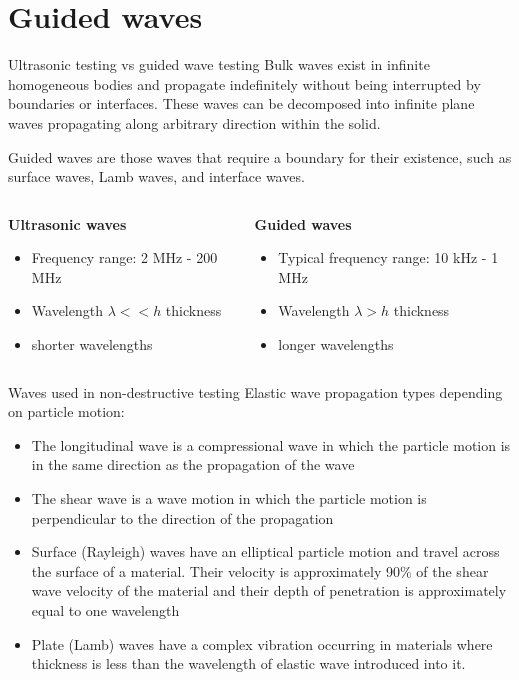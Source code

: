 \documentclass[10pt,aspectratio=169]{beamer} %
\begin{document}
\section{Guided waves}
\begin{frame}{Ultrasonic testing vs guided wave testing}
	\alert{Bulk waves} exist in infinite homogeneous bodies and propagate indefinitely without being interrupted by boundaries or interfaces. 
	These waves can be decomposed into infinite plane waves propagating along arbitrary direction within the solid.
	
	\alert{Guided waves} are those waves that require a boundary for their existence, such as surface waves, Lamb waves, and interface waves.
	\vspace{5mm}
	\begin{columns}[T]
		\begin{column}{0.5\textwidth}
			\textbf{Ultrasonic waves}	
			\begin{itemize}
				\item Frequency range: 2 MHz - 200 MHz
				\item Wavelength \(\lambda << h\) thickness 
				\item shorter wavelengths
			\end{itemize}
		\end{column}
		\begin{column}{0.5\textwidth}
			\textbf{Guided waves}	
			\begin{itemize}
				\item Typical frequency range: 10 kHz - 1 MHz
				\item Wavelength \(\lambda > h\) thickness 
				\item longer wavelengths
			\end{itemize}
		\end{column}
	\end{columns}			
\end{frame}
\begin{frame}{Waves used in non-destructive testing}
	Elastic wave propagation types depending on particle motion:
	\begin{itemize}
		\item  \alert{The longitudinal wave} is a compressional wave in which the particle motion is in the same direction as the propagation of the wave
		\item \alert{The shear wave} is a wave motion in which the particle motion is perpendicular to the direction of the propagation
		\item \alert{Surface (Rayleigh) waves} have an elliptical particle motion and travel across the surface of a material. Their velocity is approximately 90\% of the shear wave velocity of the material and their depth of penetration is approximately equal to one
		wavelength
		\item \alert{Plate (Lamb) waves} have a complex vibration occurring in materials where thickness is less than the wavelength of elastic wave introduced into it.
	\end{itemize}
\end{frame}
\end{document}
